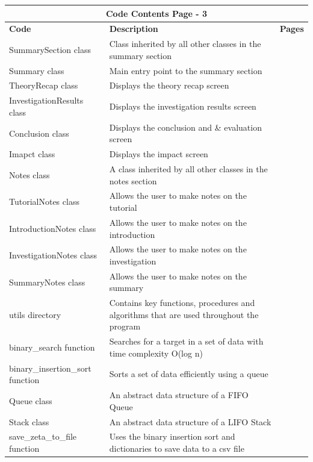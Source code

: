\documentclass{article}
\begin{document}
\begin{table}[ht]
    \centering
    \begin{tabular}{ | p{0.33\linewidth} | p{0.57\linewidth} | p{0.1\linewidth} |}
    \hline
    \multicolumn{3}{|c|}{\textbf{Code Contents Page - 3}}\\
    \hline
    \hline
    \textbf{Code} & \textbf{Description} & \textbf{Pages}\\
    \hline
    SummarySection class & Class inherited by all other classes in the summary section& \\
    \hline
    Summary class & Main entry point to the summary section & \\
    \hline
    TheoryRecap class & Displays the theory recap screen & \\
    \hline
    InvestigationResults class & Displays the investigation results screen & \\
    \hline
    Conclusion class & Displays the conclusion and \& evaluation screen & \\
    \hline
    Imapct class & Displays the impact screen & \\
    \hline
    Notes class & A class inherited by all other classes in the notes section & \\
    \hline
    TutorialNotes class & Allows the user to make notes on the tutorial & \\
    \hline
    IntroductionNotes class & Allows the user to make notes on the introduction & \\
    \hline
    InvestigationNotes class & Allows the user to make notes on the investigation & \\
    \hline
    SummaryNotes class & Allows the user to make notes on the summary & \\
    \hline
    utils directory & Contains key functions, procedures and algorithms that are used throughout the program & \\
    \hline
    binary\_search function & Searches for a target in a set of data with time complexity O(log n) & \\
    \hline
    binary\_insertion\_sort function & Sorts a set of data efficiently using a queue & \\
    \hline
    Queue class & An abstract data structure of a FIFO Queue & \\
    \hline
    Stack class & An abstract data structure of a LIFO Stack & \\
    \hline
    save\_zeta\_to\_file function & Uses the binary insertion sort and dictionaries to save data to a csv file& \\

\end{tabular}
\end{table}
\end{document}
